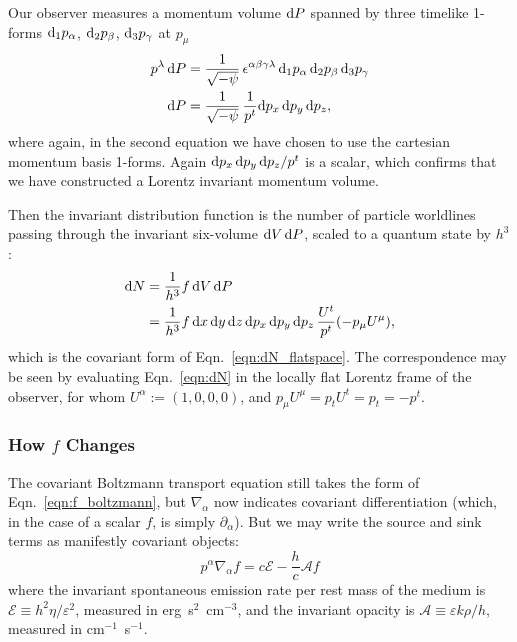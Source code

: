 Our observer
measures a momentum volume $\mathrm{d} P$ spanned by three timelike 1-forms
$\mathrm{d}_1p_\alpha$, $\mathrm{d}_2p_\beta$, $\mathrm{d}_3p_\gamma$ at $p_\mu$
\begin{align}
  \label{eqn:covariant_dP}
  p^\lambda\, \mathrm{d} P &= \frac{1}{\sqrt{-\psi}} \, \epsilon^{\alpha\beta\gamma\lambda}\,
  \mathrm{d}_1p_\alpha\, \mathrm{d}_2p_\beta\, \mathrm{d}_3p_\gamma \\
  \label{eqn:dP}
  \mathrm{d} P &= \frac{1}{\sqrt{-\psi}} \, \frac{1}{p^t} \mathrm{d} p_x\, \mathrm{d} p_y\, \mathrm{d} p_z,
\end{align}
where again, in the second equation we have chosen to use the cartesian momentum
basis 1-forms.
Again $\mathrm{d} p_x\, \mathrm{d} p_y\, \mathrm{d} p_z/p^t$ is a scalar,
which confirms that we have
constructed a Lorentz invariant momentum volume.

Then the invariant distribution function is the number of particle worldlines
passing through the invariant six-volume $\mathrm{d} V\,\mathrm{d} P$, scaled to a quantum
state by $h^3$:
\begin{align}
  \label{eqn:dN_covariant}
  \mathrm{d} N &= \frac{1}{h^3} f\, \mathrm{d} V \, \mathrm{d} P\\
  \label{eqn:dN}
  &= \frac{1}{h^3} f\,
  \mathrm{d} x\,\mathrm{d} y\,\mathrm{d} z\, \mathrm{d} p_x\, \mathrm{d} p_y\, \mathrm{d} p_z\,
  \frac{U^t}{p^t} (-p_\mu U^\mu),
\end{align}
which is the covariant form of Eqn.~\ref{eqn:dN_flatspace}. The correspondence
may be seen by evaluating Eqn.~\ref{eqn:dN} in the locally flat Lorentz frame of
the observer, for whom $U^\alpha:=(1,0,0,0)$, and
$p_\mu U^\mu=p_tU^t=p_t=-p^t$.

\subsubsection{How $f$ Changes}
The covariant Boltzmann transport equation still takes the form of
Eqn.~\ref{eqn:f_boltzmann}, but $\nabla_\alpha$ now indicates covariant
differentiation (which, in the case of a scalar $f$, is simply
$\partial_\alpha$). But we may write the source and sink terms as
manifestly covariant objects:
\begin{equation}
  p^\alpha \nabla_\alpha f = c \mathcal{E} - \frac{h}{c} \mathcal{A} f
\end{equation}
where the invariant spontaneous emission rate per rest mass of the medium is
$\mathcal{E}\equiv h^2\eta/\varepsilon^2$, measured in erg~s$^2$~cm$^{-3}$,
and the invariant opacity is
$\mathcal{A}\equiv \varepsilon k \rho/h$, measured in cm$^{-1}$~s$^{-1}$.

